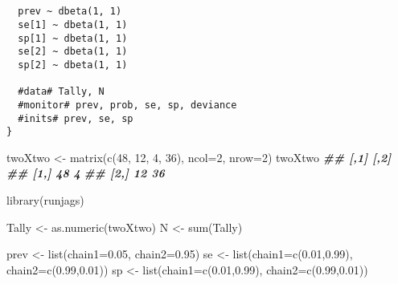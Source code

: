 \documentclass[
  ignorenonframetext,
  aspectratio=169,
]{beamer}
\newenvironment{Shaded}{\begin{snugshade}}{\end{snugshade}}
\newcommand{\AttributeTok}[1]{\textcolor[rgb]{0.77,0.63,0.00}{#1}}
\newcommand{\DecValTok}[1]{\textcolor[rgb]{0.00,0.00,0.81}{#1}}
\newcommand{\DocumentationTok}[1]{\textcolor[rgb]{0.56,0.35,0.01}{\textbf{\textit{#1}}}}
\newcommand{\FloatTok}[1]{\textcolor[rgb]{0.00,0.00,0.81}{#1}}
\newcommand{\FunctionTok}[1]{\textcolor[rgb]{0.00,0.00,0.00}{#1}}
\newcommand{\NormalTok}[1]{#1}
\newcommand{\OtherTok}[1]{\textcolor[rgb]{0.56,0.35,0.01}{#1}}
\newcommand{\StringTok}[1]{\textcolor[rgb]{0.31,0.60,0.02}{#1}}
\begin{document}
\begin{frame}[fragile]
\scriptsize

\begin{verbatim}
 

  prev ~ dbeta(1, 1)
  se[1] ~ dbeta(1, 1)
  sp[1] ~ dbeta(1, 1)
  se[2] ~ dbeta(1, 1)
  sp[2] ~ dbeta(1, 1)

  #data# Tally, N
  #monitor# prev, prob, se, sp, deviance
  #inits# prev, se, sp
}
\end{verbatim}

\normalsize
\end{frame}

\begin{frame}[fragile]
\scriptsize

\begin{Shaded}
\begin{Highlighting}[]
\NormalTok{twoXtwo }\OtherTok{\textless{}{-}} \FunctionTok{matrix}\NormalTok{(}\FunctionTok{c}\NormalTok{(}\DecValTok{48}\NormalTok{, }\DecValTok{12}\NormalTok{, }\DecValTok{4}\NormalTok{, }\DecValTok{36}\NormalTok{), }\AttributeTok{ncol=}\DecValTok{2}\NormalTok{, }\AttributeTok{nrow=}\DecValTok{2}\NormalTok{)}
\NormalTok{twoXtwo}
\DocumentationTok{\#\#      [,1] [,2]}
\DocumentationTok{\#\# [1,]   48    4}
\DocumentationTok{\#\# [2,]   12   36}
\end{Highlighting}
\end{Shaded}

\normalsize

\scriptsize

\begin{Shaded}
\begin{Highlighting}[]
\FunctionTok{library}\NormalTok{(}\StringTok{\textquotesingle{}runjags\textquotesingle{}}\NormalTok{)}

\NormalTok{Tally }\OtherTok{\textless{}{-}} \FunctionTok{as.numeric}\NormalTok{(twoXtwo)}
\NormalTok{N }\OtherTok{\textless{}{-}} \FunctionTok{sum}\NormalTok{(Tally)}

\NormalTok{prev }\OtherTok{\textless{}{-}} \FunctionTok{list}\NormalTok{(}\AttributeTok{chain1=}\FloatTok{0.05}\NormalTok{, }\AttributeTok{chain2=}\FloatTok{0.95}\NormalTok{)}
\NormalTok{se }\OtherTok{\textless{}{-}} \FunctionTok{list}\NormalTok{(}\AttributeTok{chain1=}\FunctionTok{c}\NormalTok{(}\FloatTok{0.01}\NormalTok{,}\FloatTok{0.99}\NormalTok{), }\AttributeTok{chain2=}\FunctionTok{c}\NormalTok{(}\FloatTok{0.99}\NormalTok{,}\FloatTok{0.01}\NormalTok{))}
\NormalTok{sp }\OtherTok{\textless{}{-}} \FunctionTok{list}\NormalTok{(}\AttributeTok{chain1=}\FunctionTok{c}\NormalTok{(}\FloatTok{0.01}\NormalTok{,}\FloatTok{0.99}\NormalTok{), }\AttributeTok{chain2=}\FunctionTok{c}\NormalTok{(}\FloatTok{0.99}\NormalTok{,}\FloatTok{0.01}\NormalTok{))}


\end{Highlighting}
\end{Shaded}
\end{frame}
\end{document}
